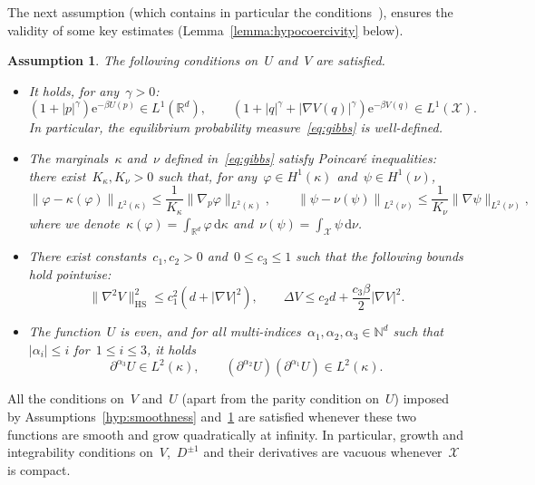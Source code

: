 \documentclass[10pt]{article}
\renewcommand{\d}{\mathrm{d}}
\newcommand{\e}{\mathrm{e}}
\newcommand{\R}{\mathbb{R}}
\newcommand{\cX}{\mathcal{X}}
\newcommand{\N}{\mathbb N}
\newcommand{\1}{\mathbbm 1}
\newtheorem{hypothesis}{Assumption}
\begin{document}
The next assumption (which contains in particular the conditions~\cite[Assumptions 3.1 and~3.2]{BFLS22}), ensures the validity of some key estimates (Lemma~\ref{lemma:hypocoercivity} below).
    \begin{hypothesis}
        \label{hyp:UVreg}
        The following conditions on~$U$ and~$V$ are satisfied.
        \begin{itemize}
        \item{It holds, for any~$\gamma>0$:
        \begin{equation}
            \label{eq:moment_bounds}
        (1+|p|^\gamma)\e^{-\beta U(p)}\in L^1(\R^d),\qquad(1+|q|^\gamma+|\nabla V(q)|^\gamma)\e^{-\beta V(q)}\in L^1(\cX).
        \end{equation}
         In particular, the equilibrium probability measure~\eqref{eq:gibbs} is well-defined.}
         \item{
          The marginals~$\kappa$ and~$\nu$ defined in~\eqref{eq:gibbs} satisfy Poincar\'e inequalities: there exist~$K_\kappa,K_\nu>0$ such that, for any~$\varphi\in H^1(\kappa)$ and~$\psi\in H^1(\nu)$,
        \begin{equation}
            \label{eq:poincare}
            \left\|\varphi-\kappa(\varphi)\right\|_{L^2(\kappa)}\leq \frac1{K_\kappa}\|\nabla_p\varphi\|_{L^2(\kappa)},\qquad \left\|\psi-\nu(\psi)\right\|_{L^2(\nu)}\leq \frac1{K_\nu}\|\nabla\psi\|_{L^2(\nu)},
        \end{equation}
        where we denote~$\kappa(\varphi)=\int_{\R^d}\varphi\,\d\kappa$ and~$\nu(\psi)=\int_{\cX}\psi\,\d\nu$.}
        \item{There exist constants~$c_1,c_2>0$ and~$0\leq c_3\leq 1$ such that the following bounds hold pointwise:
        \begin{equation}
        \label{eq:Vreg}
        \|\nabla ^2 V\|^2_{\mathrm{HS}} \leq c_1^2\left(d+|\nabla V|^2\right),\qquad \Delta V\leq c_2 d + \frac{c_3 \beta}{2}|\nabla V|^2.
        \end{equation}
        }
        \item{The function~$U$ is even, and for all multi-indices~$\alpha_1,\alpha_2,\alpha_3 \in\N^d$ such that~$|\alpha_i|\leq i$ for~${1\leq i\leq 3}$, it holds
        \begin{equation}
            \label{eq:Ureg}
        \partial^{\alpha_3} U\in L^2(\kappa),\qquad (\partial^{\alpha_2} U)(\partial^{\alpha_1}U) \in L^2(\kappa).
        \end{equation}}
        \end{itemize}
    \end{hypothesis}
    All the conditions on~$V$ and~$U$ (apart from the parity condition on~$U$) imposed by Assumptions~\ref{hyp:smoothness} and~\ref{hyp:UVreg} are satisfied whenever these two functions are smooth and grow quadratically at infinity.
    In particular, growth and integrability conditions on~$V$,~$D^{\pm 1}$ and their derivatives are vacuous whenever~$\cX$ is compact.
\end{document}

